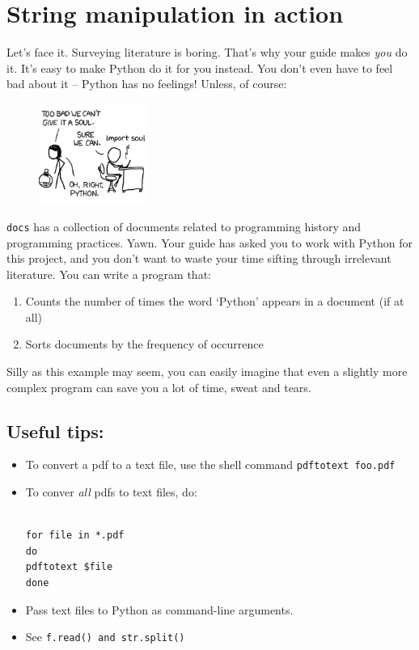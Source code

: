 \documentclass{article}
\begin{document}
\section*{String manipulation in action}
Let's face it. Surveying literature is boring. That's why your guide makes 
\emph{you} do it. It's easy to make Python do it for you instead. You don't even
have to feel bad about it -- Python has no feelings! Unless, of course:
\begin{figure}[h]
\begin{center}
\includegraphics[width=100pt]{../../pictures/import_soul.png}
\end{center}
\end{figure}
\newline \texttt{docs} has a collection of documents related to programming
history and programming practices. Yawn. Your guide has asked you to work
with Python for this project, and you don't want to waste your time sifting through
irrelevant literature. You can write a program that:
\begin{enumerate}
\item Counts the number of times the word `Python' appears in a document (if at all)
\item Sorts documents by the frequency of occurrence
\end {enumerate}
Silly as this example may seem, you can easily imagine that even a slightly
more complex program can save you a lot of time, sweat and tears.
\subsection*{Useful tips:}
\begin{itemize}
\item To convert a pdf to a text file, use the shell command \texttt{pdftotext foo.pdf}
\item To conver \emph{all} pdfs to text files, do:
\begin{verbatim}

for file in *.pdf
do
pdftotext $file
done

\end{verbatim}

\item Pass text files to Python as command-line arguments.
\item See \texttt{f.read() and str.split()}
\end{itemize}
\end{document}
